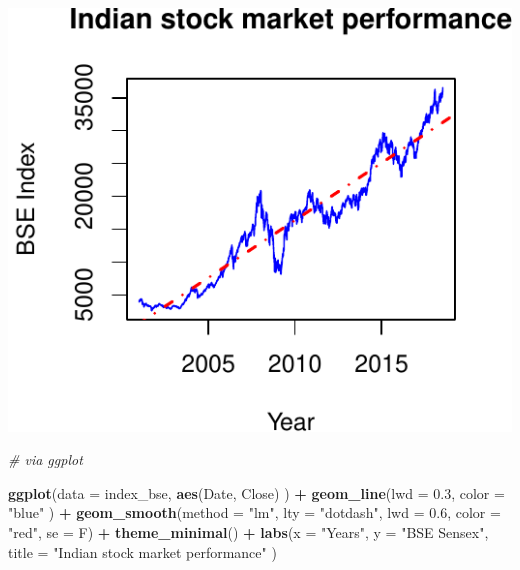 \documentclass[11pt,]{article}
\newenvironment{Shaded}{\begin{snugshade}}{\end{snugshade}}
\newcommand{\KeywordTok}[1]{\textcolor[rgb]{0.13,0.29,0.53}{\textbf{#1}}}
\newcommand{\DataTypeTok}[1]{\textcolor[rgb]{0.13,0.29,0.53}{#1}}
\newcommand{\FloatTok}[1]{\textcolor[rgb]{0.00,0.00,0.81}{#1}}
\newcommand{\StringTok}[1]{\textcolor[rgb]{0.31,0.60,0.02}{#1}}
\newcommand{\CommentTok}[1]{\textcolor[rgb]{0.56,0.35,0.01}{\textit{#1}}}
\newcommand{\OperatorTok}[1]{\textcolor[rgb]{0.81,0.36,0.00}{\textbf{#1}}}
\newcommand{\NormalTok}[1]{#1}
\begin{document}
\begin{center}\includegraphics{FMC_T4_PhD_Fin_Time_Series_files/figure-latex/BSE-1} \end{center}

\begin{Shaded}
\begin{Highlighting}[]
\CommentTok{# via ggplot}

\KeywordTok{ggplot}\NormalTok{(}\DataTypeTok{data =}\NormalTok{ index_bse, }
       \KeywordTok{aes}\NormalTok{(Date, Close)}
\NormalTok{       ) }\OperatorTok{+}
\StringTok{  }\KeywordTok{geom_line}\NormalTok{(}\DataTypeTok{lwd =} \FloatTok{0.3}\NormalTok{,}
            \DataTypeTok{color =} \StringTok{"blue"}
\NormalTok{            ) }\OperatorTok{+}
\StringTok{  }\KeywordTok{geom_smooth}\NormalTok{(}\DataTypeTok{method =} \StringTok{"lm"}\NormalTok{,}
              \DataTypeTok{lty =} \StringTok{"dotdash"}\NormalTok{,}
              \DataTypeTok{lwd =} \FloatTok{0.6}\NormalTok{,}
              \DataTypeTok{color =} \StringTok{"red"}\NormalTok{,}
              \DataTypeTok{se =}\NormalTok{ F) }\OperatorTok{+}
\StringTok{  }\KeywordTok{theme_minimal}\NormalTok{() }\OperatorTok{+}
\StringTok{  }\KeywordTok{labs}\NormalTok{(}\DataTypeTok{x =} \StringTok{"Years"}\NormalTok{,}
       \DataTypeTok{y =} \StringTok{"BSE Sensex"}\NormalTok{,}
       \DataTypeTok{title =} \StringTok{"Indian stock market performance"}
\NormalTok{       )}
\end{Highlighting}
\end{Shaded}
\end{document}
